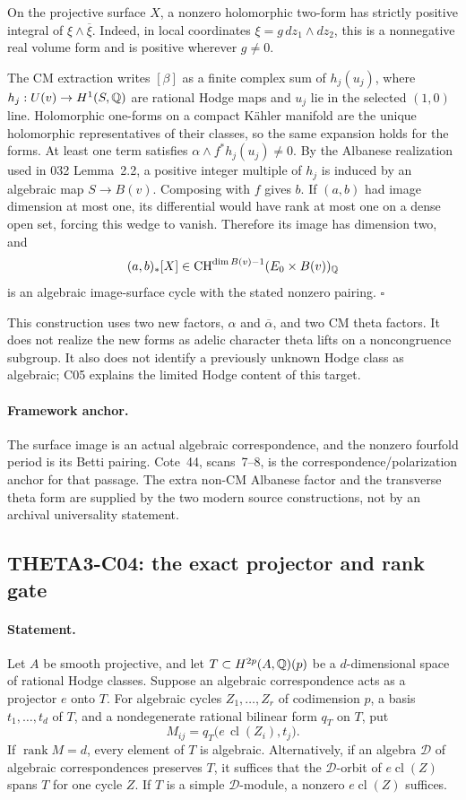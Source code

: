 On the projective surface $X$, a nonzero holomorphic two-form has
strictly positive integral of $\xi\wedge\overline\xi$. Indeed, in
local coordinates $\xi=g\,dz_1\wedge dz_2$, this is a nonnegative
real volume form and is positive wherever $g\ne0$.

The CM extraction writes $[\beta]$ as a finite complex sum of
$h_j(u_j)$, where $h_j:U(v)\to H^1(S,\mathbb Q)$ are rational Hodge maps
and $u_j$ lie in the selected $(1,0)$ line. Holomorphic one-forms on
a compact K\"ahler manifold are the unique holomorphic
representatives of their classes, so the same expansion holds for
the forms. At least one term satisfies
$\alpha\wedge f^*h_j(u_j)\ne0$. By the Albanese realization used
in 032 Lemma~2.2, a positive integer multiple of $h_j$ is induced
by an algebraic map $S\to B(v)$. Composing with $f$ gives $b$.
If $(a,b)$ had image dimension at most one, its differential would
have rank at most one on a dense open set, forcing this wedge to
vanish. Therefore its image has dimension two, and
\[
 (a,b)_*[X]\in
 \operatorname{CH}^{\dim B(v)-1}(E_0\times B(v))_{\mathbb Q}
\]
is an algebraic image-surface cycle with the stated nonzero pairing.
$\square$

This construction uses two new factors, $\alpha$ and
$\overline\alpha$, and two CM theta factors. It does not realize
the new forms as adelic character theta lifts on a noncongruence
subgroup. It also does not identify a previously unknown Hodge class
as algebraic; C05 explains the limited Hodge content of this target.

\paragraph{Framework anchor.}
The surface image is an actual algebraic correspondence, and the nonzero
fourfold period is its Betti pairing.  Cote~44, scans~7--8, is the
correspondence/polarization anchor for that passage.  The extra non-CM
Albanese factor and the transverse theta form are supplied by the two
modern source constructions, not by an archival universality statement.

\subsection{THETA3-C04: the exact projector and rank gate}\label{C04}

\paragraph{Statement.}
Let $A$ be smooth projective, and let
$T\subset H^{2p}(A,\mathbb Q)(p)$ be a $d$-dimensional space of rational
Hodge classes. Suppose an algebraic correspondence acts as a
projector $e$ onto $T$. For algebraic cycles $Z_1,\ldots,Z_r$ of
codimension $p$, a basis $t_1,\ldots,t_d$ of $T$, and a
nondegenerate rational bilinear form $q_T$ on $T$, put
\[
 M_{ij}=q_T\bigl(e\,\operatorname{cl}(Z_i),t_j\bigr).
\]
If $\operatorname{rank}M=d$, every element of $T$ is algebraic.
Alternatively, if an algebra $\mathcal D$ of algebraic
correspondences preserves $T$, it suffices that the
$\mathcal D$-orbit of $e\operatorname{cl}(Z)$ spans $T$ for one
cycle $Z$. If $T$ is a simple $\mathcal D$-module, a nonzero
$e\operatorname{cl}(Z)$ suffices.

